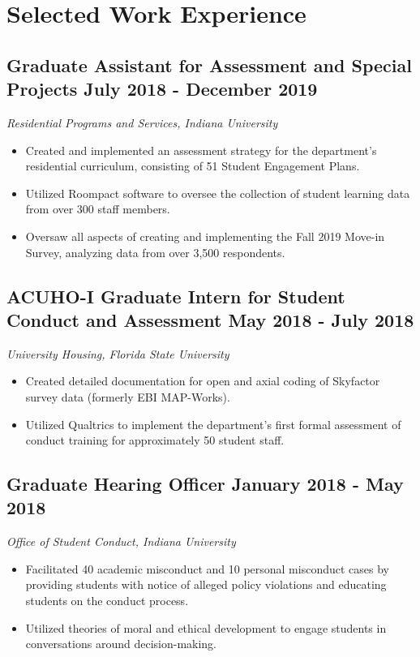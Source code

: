 \documentclass{article}
\begin{document}
\section*{Selected Work Experience\hrulefill}

\subsection*{Graduate Assistant for Assessment and Special Projects \hfill
  \textnormal{July 2018 - December 2019}}
\textit{Residential Programs and Services, Indiana University}
\begin{itemize}
\item Created and implemented an assessment strategy for the department's
  residential curriculum, consisting of 51 Student Engagement Plans.
\item Utilized Roompact software to oversee the collection of student learning
  data from over 300 staff members.
\item Oversaw all aspects of creating and implementing the Fall 2019 Move-in
  Survey, analyzing data from over 3,500 respondents. 
\end{itemize}

\subsection*{ACUHO-I Graduate Intern for Student Conduct and Assessment  \hfill
  \textnormal{May 2018 - July 2018}}
\textit{University Housing, Florida State University}
\begin{itemize}
\item Created detailed documentation for open and axial coding of Skyfactor
  survey data (formerly EBI MAP-Works). 
\item Utilized Qualtrics to implement the department's first formal assessment
  of conduct training for approximately 50 student staff. 
\end{itemize}

\subsection*{Graduate Hearing Officer  \hfill
  \textnormal{January 2018 - May 2018}}
\textit{Office of Student Conduct, Indiana University}
\begin{itemize}
\item Facilitated 40 academic misconduct and 10 personal misconduct cases by
  providing students with notice of alleged policy violations and educating
  students on the conduct process.
\item Utilized theories of moral and ethical development to engage students in
  conversations around decision-making.
\end{itemize}
\end{document}
